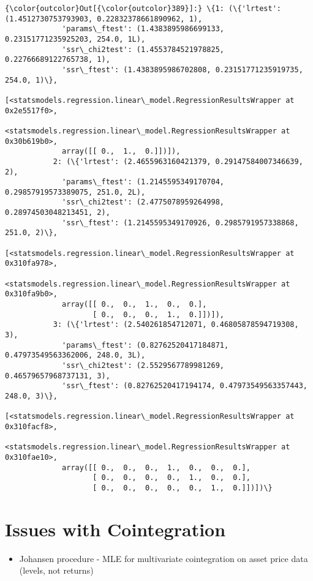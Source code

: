 \documentclass{article}
\providecommand{\tightlist}{%
      \setlength{\itemsep}{0pt}\setlength{\parskip}{0pt}}
\begin{document}
            \begin{Verbatim}[commandchars=\\\{\}]
{\color{outcolor}Out[{\color{outcolor}389}]:} \{1: (\{'lrtest': (1.4512730753793903, 0.22832378661890962, 1),
             'params\_ftest': (1.4383895986699133, 0.23151771235925203, 254.0, 1L),
             'ssr\_chi2test': (1.4553784521978825, 0.22766689122765738, 1),
             'ssr\_ftest': (1.4383895986702808, 0.23151771235919735, 254.0, 1)\},
            [<statsmodels.regression.linear\_model.RegressionResultsWrapper at 0x2e5517f0>,
             <statsmodels.regression.linear\_model.RegressionResultsWrapper at 0x30b619b0>,
             array([[ 0.,  1.,  0.]])]),
           2: (\{'lrtest': (2.4655963160421379, 0.29147584007346639, 2),
             'params\_ftest': (1.2145595349170704, 0.29857919573389075, 251.0, 2L),
             'ssr\_chi2test': (2.4775078959264998, 0.28974503048213451, 2),
             'ssr\_ftest': (1.2145595349170926, 0.2985791957338868, 251.0, 2)\},
            [<statsmodels.regression.linear\_model.RegressionResultsWrapper at 0x310fa978>,
             <statsmodels.regression.linear\_model.RegressionResultsWrapper at 0x310fa9b0>,
             array([[ 0.,  0.,  1.,  0.,  0.],
                    [ 0.,  0.,  0.,  1.,  0.]])]),
           3: (\{'lrtest': (2.540261854712071, 0.46805878594719308, 3),
             'params\_ftest': (0.82762520417184871, 0.47973549563362006, 248.0, 3L),
             'ssr\_chi2test': (2.5529567789981269, 0.46579657968737131, 3),
             'ssr\_ftest': (0.82762520417194174, 0.47973549563357443, 248.0, 3)\},
            [<statsmodels.regression.linear\_model.RegressionResultsWrapper at 0x310facf8>,
             <statsmodels.regression.linear\_model.RegressionResultsWrapper at 0x310fae10>,
             array([[ 0.,  0.,  0.,  1.,  0.,  0.,  0.],
                    [ 0.,  0.,  0.,  0.,  1.,  0.,  0.],
                    [ 0.,  0.,  0.,  0.,  0.,  1.,  0.]])])\}
\end{Verbatim}
        
    \section{Issues with Cointegration}\label{issues-with-cointegration}

\begin{itemize}
\tightlist
\item
  Johansen procedure - MLE for multivariate cointegration on asset price
  data (levels, not returns)
\end{itemize}
\end{document}
